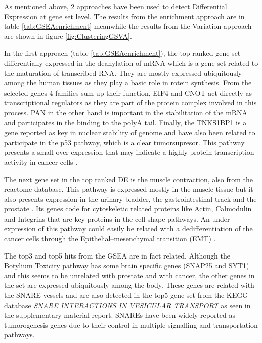 \documentclass[9pt,twocolumn,twoside]{gsajnl}
\begin{document}
As mentioned above, 2 approaches have been used to detect Differential Expression at gene set level. The results from the enrichment approach are in table \ref{tab:GSEAenrichment} meanwhile the results from the Variation approach are shown in figure \ref{fig:ClusteringGSVA}.

In the first approach (table \ref{tab:GSEAenrichment}), the top ranked gene set differentially expressed in the deanylation of mRNA which is a gene set related to the maturation of transcribed RNA. They are mostly expressed ubiquitously among the human tissues as they play a basic role in rotein synthesis. From the selected genes 4 families sum up their function, EIF4 and CNOT act directly as transcriptional regulators as they are part of the protein complex involved in this process. PAN in the other hand is important in the stabilitation of the mRNA and participates in the binding to the polyA tail. Finally, the TNKS1BP1 is a gene reported as key in nuclear stability of genome and have also been related to participate in the p53 pathway, which is a clear tumorsupresor. This pathway presents a small over-expression that may indicate a highly protein transcription activity in cancer cells \cite{proteinatlas}.

The next gene set in the top ranked DE is the muscle contraction, also from the reactome database. This pathway is expressed mostly in the muscle tissue but it also presents expression in the urinary bladder, the gastrointestinal track and the prostate \cite{proteinatlas}. Its genes code for cytoskeletic related proteins like Actin, Calmodulin and Integrins that are key proteins in the cell shape pathways. An under-expression of this pathway could easily be related with a dedifferentiation of the cancer cells through the Epithelial–mesenchymal transition (EMT) \citep{yilmaz2009emt}.

The top3 and top5 hits from the GSEA are in fact related. Although the Botylium Toxicity pathway has some brain specific genes (SNAP25 and SYT1) and this seems to be unrelated with prostate and with cancer, the other genes in the set are expressed ubiquitously among the body. These genes are related with the SNARE vessels and are also detected in the top5 gene set from the KEGG database \textit{SNARE INTERACTIONS IN VESICULAR TRANSPORT} as seen in the supplementary material report. SNAREs have been widely reported as tumorogenesis genes due to their control in multiple signalling and transportation pathways.
\end{document}

